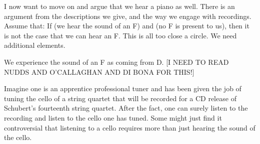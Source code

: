 \documentclass[sloppy, journal, git, bytitle, dodraft]{humapap}
\begin{document}




\sect I now want to move on and argue that we hear a piano as well. 
There is an argument from the descriptions we give, and the way we engage with recordings.
Assume that: If (we hear the sound of an F) and (no F is present to us), then it is not the case that we can hear an F. This is all too close a circle. We need additional elements. 

We experience the sound of an F as coming from D. [I NEED TO READ NUDDS AND O'CALLAGHAN AND DI BONA FOR THIS!] 

Imagine one is an apprentice professional tuner and has been given the job of tuning the cello of a string quartet that will be recorded for a CD release of Schubert's fourteenth string quartet. After the fact, one can surely listen to the recording and listen to the cello one has tuned. Some might just find it controversial that listening to a cello requires more than just hearing the sound of the cello.
\end{document}
